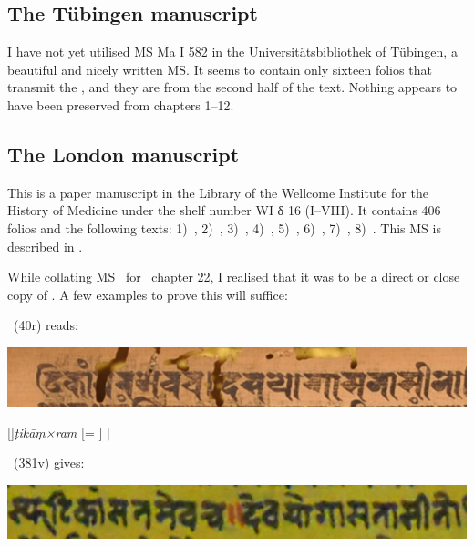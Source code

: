 \medskip
\subsection{The Tübingen manuscript}

I have not yet utilised MS Ma I 582 in the Universitätsbibliothek of
Tübingen, a beautiful and nicely written MS. It seems to contain only sixteen folios that transmit the \VSS, and they are from the
second half of the text. Nothing appears to have been preserved
from chapters 1--12.



\medskip
\subsection{The London manuscript}

This is a paper manuscript in the
Library of the Wellcome Institute for the History of Medicine
under the shelf number WI δ 16 (I--VIII). 
It contains 406 folios and the following texts: 
1)~, 
2)~,
3)~, 
4)~, 
5)~,
6)~\Uums,
7)~,
8)~.
This MS is described in .

While collating MS \msL\ for \VSS\ chapter 22, 
I realised that it was to be a direct or close copy of \msNa. 
A few examples to prove this will suffice:

\msNa\ (\fol40r) reads: 
\smallskip

\includegraphics[scale=.3]{images/dasayoga_msNa.png}

\smallskip

\hspace{2em}[]\textit{ṭikāṃ×ram} [= ]  $|$ 

\medskip

\msL\ (\fol381v) gives:
\smallskip

\includegraphics[scale=.3]{images/dasayoga_msL.png}
\smallskip

